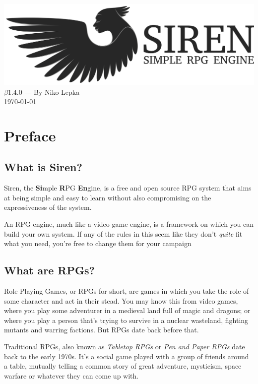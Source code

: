 \documentclass[a4paper]{book}
\begin{document}
\begin{titlepage}
\begin{center}
  \includegraphics[width = \textwidth]{graphics/svg-logo.png}
  \LARGE{$\beta1.4.0$ --- By Niko Lepka}\\
  \Large{\today}
\end{center}
\end{titlepage}
\newpage
\null
\pagestyle{empty}
\newpage
{} %

\chapter*{Preface}
\section*{What is Siren?}
Siren, the \textbf{Si}mple \textbf{R}PG \textbf{En}gine, is a free and open source RPG system that aims at being simple and easy to learn without also compromising on the expressiveness of the system.

An RPG engine, much like a video game engine, is a framework on which you can build your own system. If any of the rules in this seem like they don't \textit{quite} fit what you need, you're free to change them for your campaign

\section*{What are RPGs?}
Role Playing Games, or RPGs for short, are games in which you take the role of some character and act in their stead.
You may know this from video games, where you play some adventurer in a medieval land full of magic and dragons; or where you play a person that's trying to survive in a nuclear wasteland, fighting mutants and warring factions.
But RPGs date back before that.

Traditional RPGs, also known as \textit{Tabletop RPGs} or \textit{Pen and Paper RPGs} date back to the early 1970s.
It's a social game played with a group of friends around a table, mutually telling a common story of great adventure, mysticism, space warfare or whatever they can come up with.
\end{document}
